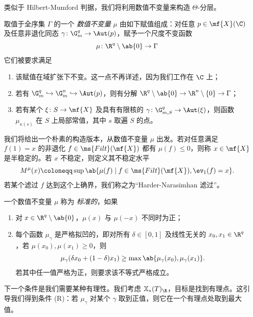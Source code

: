 类似于 Hilbert-Mumford 判据，我们将利用数值不变量来构造 \(\Theta\)-分层。
\begin{defn}
    取值于全序集 \(\Gamma\) 的一个 \textit{数值不变量} \(\mu\) 由如下赋值组成：对任意 \(p \in \mf{X}(\C)\) 及任意非退化同态 \(\gamma \colon \G_m^q \to \Aut(p)\)，赋予一个尺度不变函数
    \[ \mu \colon \R^q \setminus \ab\{0\} \to \Gamma \]
    它们被要求满足
    \begin{enumerate}
        \item 该赋值在域扩张下不变。这一点不再详述，因为我们工作在 \(\C\) 上；
        \item 若有 \(\G_m^q \hookrightarrow \G_m^n \hookrightarrow \Aut(p)\)，则有分解 \(\R^q \setminus \ab\{0\} \to \R^n \setminus \{0\} \to \Gamma\)；
        \item 若有某个 \(\xi \colon S \to \mf{X}\) 及具有有限核的 \(\gamma \colon \G_{m, S}^q \to \Aut(\xi)\)，则函数 \(\mu_{\kappa(s)}\) 在 \(S\) 上局部常值，其中 \(s\) 取遍 \(S\) 的点。
    \end{enumerate}
\end{defn}

我们将给出一个朴素的构造版本，从数值不变量 \(\mu\) 出发。若对任意满足 \(f(1) = x\) 的非退化 \(f \in \ms{Filt}(\mf{X})\) 都有 \(\mu(f) \leq 0\)，则称 \(x \in \mf{X}\) 是半稳定的。若 \(x\) 不稳定，则定义其不稳定水平
\[ M^{\mu}(x) \coloneqq \sup \ab\{ \mu(f) \mid f \in \ms{Filt}(\mf{X}), \ev_1(f) = x\}. \]
若某个滤过 \(f\) 达到这个上确界，我们称之为“Harder-Narasimhan 滤过”。

\begin{defn}
    一个数值不变量 \(\mu\) 称为 \textit{标准的}，如果
    \begin{enumerate}
        \item 对 \(x \in \R^q \setminus \ab\{0\}\)，\(\mu(x)\) 与 \(\mu(-x)\) 不同时为正；
        \item 每个函数 \(\mu_{\gamma}\) 是严格拟凹的，即对所有 \(\delta \in [0,1]\) 及线性无关的 \(x_0, x_1 \in \R^q\)，若 \(\mu(x_0), \mu(x_1) \geq 0\)，则 
            \[\mu_{\gamma}(\delta x_0 + (1-\delta)x_1) \geq \max\ab\{\mu_{\gamma}(x_0), \mu_{\gamma}(x_1)\}.\] 若其中任一值严格为正，则要求该不等式严格成立。
    \end{enumerate}
\end{defn}

下一个条件是我们需要某种有理性。我们考虑 \(\mathbb{X}_*(T)_{\R}\)，目标是找到有理点。这引导我们得到条件 (R)：若 \(\mu_{\gamma}\) 对某个 \(\gamma\) 取到正值，则它在一个有理点处取到最大值。

